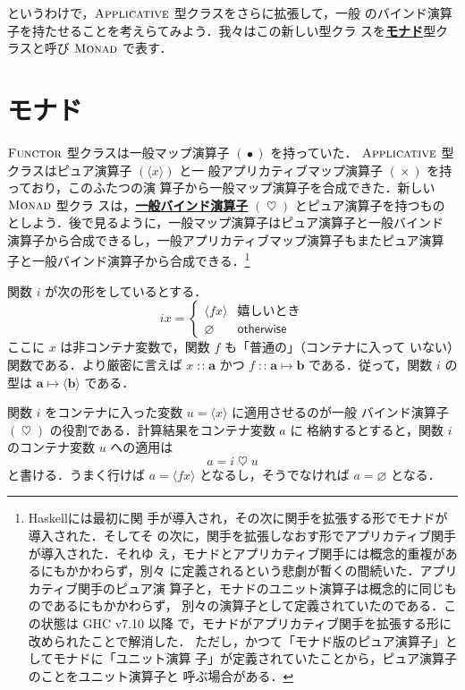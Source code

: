 \documentclass[a5paper,twoside,fleqn]{jsbook}
\newcommand{\programminglanguage}[1]{\textsf{#1}}
\newcommand{\haskell}{\programminglanguage{Haskell}}
\newcommand{\keyword}[1]{{\underline{\textbf{#1}}}}
\newcommand{\mKeyword}[1]{\mathsf{#1}} %
\newcommand{\mOtherwiseKeyword}{\mKeyword{otherwise}}
\DeclareMathOperator{\mOtherwise}{\mOtherwiseKeyword}
\newcommand{\mPureNothing}{\varnothing}
\DeclareMathOperator{\mAppMap}{\times}
\DeclareMathOperator{\mBind}{\heartsuit}
\DeclareMathOperator{\mIn}{{:\!:}}
\DeclareMathOperator{\mMap}{\bullet}
\DeclareMathOperator{\mMapsTo}{\mapsto}
\newcommand{\mType}[1]{\mathbf{#1}}
\newcommand{\mPureType}[1]{\langle\mType{#1}\rangle}
\newcommand{\mPureWith}[1]{\langle#1\rangle}
\newcommand{\mGenericTypeClass}[1]{\textsc{#1}} %
\newcommand{\mApplicativeTypeClass}{\mGenericTypeClass{Applicative}}
\newcommand{\mFunctorTypeClass}{\mGenericTypeClass{Functor}}
\newcommand{\mMonadTypeClass}{\mGenericTypeClass{Monad}}
\newcommand{\mProj}[2]{#1\mMapsTo#2}
\begin{document}
というわけで，$\mApplicativeTypeClass$ 型クラスをさらに拡張して，一般
のバインド演算子を持たせることを考えらてみよう．我々はこの新しい型クラ
スを\keyword{モナド}型クラスと呼び $\mMonadTypeClass$ で表す．

\section{モナド}

$\mFunctorTypeClass$ 型クラスは一般マップ演算子 $(\mMap)$ を持っていた．
$\mApplicativeTypeClass$ 型クラスはピュア演算子 $(\mPureWith{x})$ と一
般アプリカティブマップ演算子 $(\mAppMap)$ を持っており，このふたつの演
算子から一般マップ演算子を合成できた．新しい $\mMonadTypeClass$ 型クラ
スは，\keyword{一般バインド演算子} $(\mBind)$ とピュア演算子を持つもの
としよう．後で見るように，一般マップ演算子はピュア演算子と一般バインド
演算子から合成できるし，一般アプリカティブマップ演算子もまたピュア演算
子と一般バインド演算子から合成できる．\footnote{\haskell には最初に関
手が導入され，その次に関手を拡張する形でモナドが導入された．そしてそ
の次に，関手を拡張しなおす形でアプリカティブ関手が導入された．それゆ
え，モナドとアプリカティブ関手には概念的重複があるにもかかわらず，別々
に定義されるという悲劇が暫くの間続いた．アプリカティブ関手のピュア演
算子と，モナドのユニット演算子は概念的に同じものであるにもかかわらず，
別々の演算子として定義されていたのである．この状態は GHC v7.10 以降
で，モナドがアプリカティブ関手を拡張する形に改められたことで解消した．
ただし，かつて「モナド版のピュア演算子」としてモナドに「ユニット演算
子」が定義されていたことから，ピュア演算子のことをユニット演算子と
呼ぶ場合がある．}

関数 $i$ が次の形をしているとする．
\begin{equation}
\label{eq:def-of-i}
ix=\begin{cases}
\mPureWith{fx}&\text{嬉しいとき}\\
\mPureNothing&\mOtherwise
\end{cases}
\end{equation}
ここに $x$ は非コンテナ変数で，関数 $f$ も「普通の」（コンテナに入って
  いない）関数である．より厳密に言えば $x\mIn\mType{a}$ かつ
$f\mIn\mProj{\mType{a}}{\mType{b}}$ である．従って，関数 $i$ の型は
$\mProj{\mType{a}}{\mPureType{b}}$ である．

関数 $i$ をコンテナに入った変数 $u=\mPureWith{x}$ に適用させるのが一般
バインド演算子 $(\mBind)$ の役割である．計算結果をコンテナ変数 $a$ に
格納するとすると，関数 $i$ のコンテナ変数 $u$ への適用は
\begin{equation}
\label{eq:i-love-u}
a=i\mBind u
\end{equation}
と書ける．うまく行けば $a=\mPureWith{fx}$ となるし，そうでなければ
$a=\mPureNothing$ となる．
\end{document}
